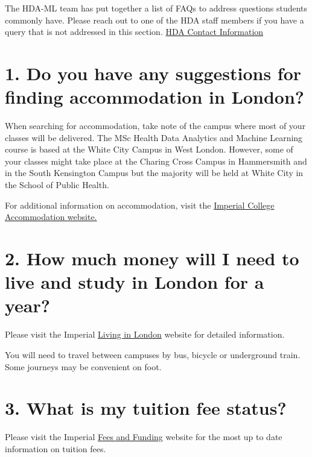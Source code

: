 \documentclass[
]{book}
\begin{document}
The HDA-ML team has put together a list of FAQs to address questions students commonly have. Please reach out to one of the HDA staff members if you have a query that is not addressed in this section. \hyperref[contact-info]{HDA Contact Information}

\section*{1. Do you have any suggestions for finding accommodation in London?}\label{do-you-have-any-suggestions-for-finding-accommodation-in-london}

When searching for accommodation, take note of the campus where most of your classes will be delivered. The MSc Health Data Analytics and Machine Learning course is based at the White City Campus in West London. However, some of your classes might take place at the Charing Cross Campus in Hammersmith and in the South Kensington Campus but the majority will be held at White City in the School of Public Health.

For additional information on accommodation, visit the \href{https://www.imperial.ac.uk/students/accommodation/}{Imperial College Accommodation website.}

\section*{2. How much money will I need to live and study in London for a year?}\label{how-much-money-will-i-need-to-live-and-study-in-london-for-a-year}

Please visit the Imperial \href{https://www.imperial.ac.uk/study/living-in-london/}{Living in London} website for detailed information.

You will need to travel between campuses by bus, bicycle or underground train. Some journeys may be convenient on foot.

\section*{3. What is my tuition fee status?}\label{what-is-my-tuition-fee-status}

Please visit the Imperial \href{https://www.imperial.ac.uk/study/fees-and-funding/tuition-fees/fee-status/}{Fees and Funding} website for the most up to date information on tuition fees.
\end{document}
